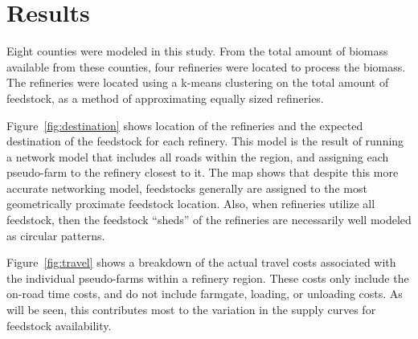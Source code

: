 \documentclass{elsart}
\begin{document}
\section{Results}

Eight counties were modeled in this study.  From the total amount of
biomass available from these counties, four refineries were located to
process the biomass.  The refineries were located using a k-means
clustering on the total amount of feedstock, as a method of
approximating equally sized refineries.

Figure~\ref{fig:destination} shows location of the refineries and the
expected destination of the feedstock for each refinery.  This model
is the result of running a network model that includes all roads
within the region, and assigning each pseudo-farm to the refinery
closest to it.  The map shows that despite this more accurate
networking model, feedstocks generally are assigned to the most
geometrically proximate feedstock location.  Also, when refineries
utilize all feedstock, then the feedstock ``sheds'' of the refineries
are necessarily well modeled as circular patterns. 

Figure~\ref{fig:travel} shows a breakdown of the actual travel costs
associated with the individual pseudo-farms within a refinery
region. These costs only include the on-road time costs, and do not
include farmgate, loading, or unloading costs.  As will be seen, this
contributes most to the variation in the supply curves for feedstock
availability.
\end{document}
